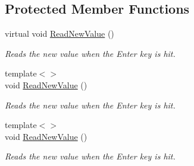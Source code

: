 \subsection*{Protected Member Functions}
\begin{DoxyCompactItemize}
\item 
\mbox{\label{class_obj_cryst_1_1_w_x_field_par_aa183a548b6f90955c110104d711e7436}} 
virtual void \mbox{\hyperlink{class_obj_cryst_1_1_w_x_field_par_aa183a548b6f90955c110104d711e7436}{Read\+New\+Value}} ()
\begin{DoxyCompactList}\small\item\em Reads the new value when the Enter key is hit. \end{DoxyCompactList}\item 
\mbox{\label{class_obj_cryst_1_1_w_x_field_par_ad7e639990ae0ae90917c8d60f9c88dd4}} 
{\footnotesize template$<$$>$ }\\void \mbox{\hyperlink{class_obj_cryst_1_1_w_x_field_par_ad7e639990ae0ae90917c8d60f9c88dd4}{Read\+New\+Value}} ()
\begin{DoxyCompactList}\small\item\em Reads the new value when the Enter key is hit. \end{DoxyCompactList}\item 
\mbox{\label{class_obj_cryst_1_1_w_x_field_par_ac164fa3929efd73902f7956427bcb8a9}} 
{\footnotesize template$<$$>$ }\\void \mbox{\hyperlink{class_obj_cryst_1_1_w_x_field_par_ac164fa3929efd73902f7956427bcb8a9}{Read\+New\+Value}} ()
\begin{DoxyCompactList}\small\item\em Reads the new value when the Enter key is hit. \end{DoxyCompactList}\end{DoxyCompactItemize}
